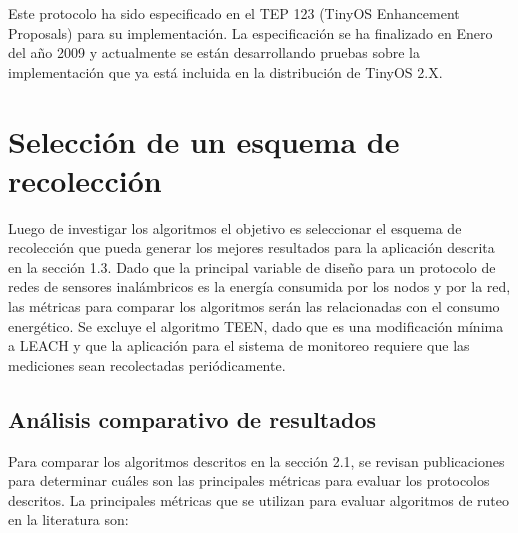 Este protocolo ha sido especificado en el TEP 123 (TinyOS Enhancement Proposals) para su implementación. La especificación se ha finalizado en Enero del año 2009 y actualmente se están desarrollando pruebas sobre la implementación que ya está incluida en la distribución de TinyOS 2.X.




\section{Selección de un esquema de recolección}
Luego de investigar los algoritmos el objetivo es seleccionar el esquema de recolección que pueda generar los mejores resultados para la aplicación  descrita en la sección 1.3. Dado que la principal variable de diseño para un protocolo de redes de sensores inalámbricos es la energía consumida por los nodos y por la red, las métricas para comparar los algoritmos serán las relacionadas con el consumo energético. Se excluye el algoritmo TEEN, dado que es una modificación mínima a LEACH y que la aplicación para el sistema de monitoreo requiere que las mediciones sean recolectadas periódicamente.

\subsection{Análisis comparativo de resultados}
Para comparar los algoritmos descritos en la sección 2.1, se revisan publicaciones para determinar cuáles son las principales métricas para evaluar los protocolos descritos. La principales métricas que se utilizan para evaluar algoritmos de ruteo en la literatura son:

